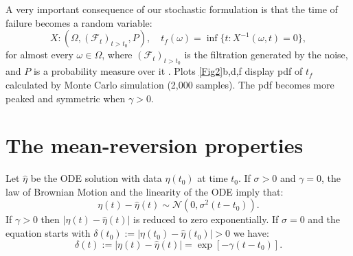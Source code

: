 \documentclass{article}
\begin{document}
A very important consequence of our stochastic formulation is that the time of failure becomes a random variable:
$$X:\left(\Omega, (\mathcal F_t)_{t>t_0}, P\right), \quad t_f(\omega)=\inf\{t: X^{-1}(\omega,t)=0\},$$
for almost every $\omega\in\Omega$, where $(\mathcal F_t)_{t>t_0}$ is the filtration generated by the noise, and $P$ is a probability measure over it \citep{Karatzas1991}. Plots \ref{Fig2}b,d,f display pdf of $t_f$ calculated by Monte Carlo simulation (2,000 samples). The pdf becomes more peaked and symmetric when $\gamma>0$.

\section{The mean-reversion properties}\label{s3}
Let $\hat\eta$ be the ODE solution with data $\eta(t_0)$ at time $t_0$. If $\sigma>0$ and $\gamma=0$, the law of Brownian Motion and the linearity of the ODE imply that:
$$\eta(t)-\hat\eta(t)\sim \mathcal N\left(0,\sigma^2(t-t_0)\right).$$
If $\gamma>0$ then $\left|\eta(t)-\hat\eta(t)\right|$ is reduced to zero exponentially. If $\sigma=0$ and the equation starts with $\delta(t_0):=|\eta(t_0)-\hat\eta(t_0)|>0$ we have:
$$\delta(t):=\left|\eta(t)-\hat\eta(t)\right|=\exp[-\gamma(t-t_0)].$$
\end{document}
